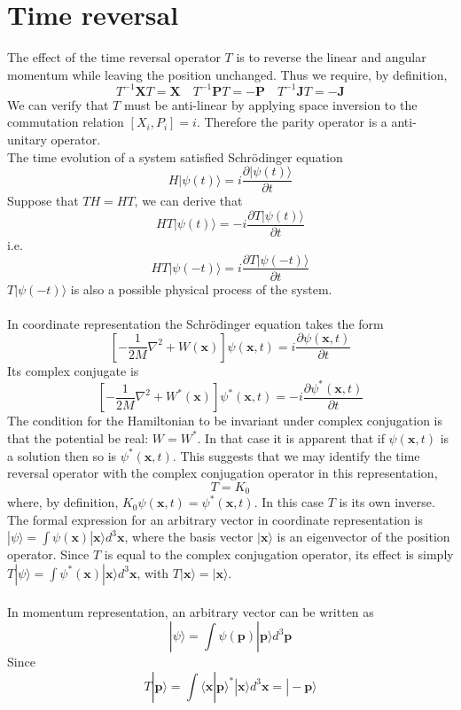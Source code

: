 \documentclass[cyan]{elegantnote}
\begin{document}
\section{Time reversal}
The effect of the time reversal operator $T$ is to reverse the linear and angular momentum while leaving the position unchanged. Thus we require, by definition,
\[T^{-1}\bm{X}T = \bm{X} \quad T^{-1}\bm{P}T = -\bm{P} \quad T^{-1}\bm{J}T = -\bm{J}\]
We can verify that $T$ must be anti-linear by applying space inversion to the commutation relation $[X_i,P_i] = i$. Therefore the parity operator is a anti-unitary operator.\\
The time evolution of a system satisfied Schrödinger equation
\[H|\psi(t)\rangle = i\frac{\partial |\psi(t)\rangle }{\partial t}\]
Suppose that $TH=HT$, we can derive that
\[HT|\psi(t)\rangle = -i\frac{\partial T|\psi(t)\rangle }{\partial t}\]
i.e.
\[HT|\psi(-t)\rangle = i\frac{\partial T|\psi(-t)\rangle }{\partial t}\]
$T|\psi(-t)\rangle$ is also a possible physical process of the system.\\ \\
In coordinate representation the Schrödinger equation takes the form
\[ \left[ -\frac{1}{2M}\nabla^2 + W(\bm{x}) \right] \psi(\bm{x},t) = i\frac{\partial \psi(\bm{x},t)}{\partial t}\]
Its complex conjugate is
\[ \left[ -\frac{1}{2M}\nabla^2 + W^*(\bm{x}) \right] \psi^*(\bm{x},t) = -i\frac{\partial \psi^*(\bm{x},t)}{\partial t}\]
The condition for the Hamiltonian to be invariant under complex conjugation is that the potential be real: $W=W^*$. In that case it is apparent that if $\psi(\bm{x},t)$ is a solution then so is  $\psi^*(\bm{x},t)$. This suggests that we may identify the time reversal operator with the complex conjugation operator in this representation,
\[T = K_0\]
where, by definition, $K_0\psi(\bm{x},t) = \psi^*(\bm{x},t)$. In this case $T$ is its own inverse. 
The formal expression for an arbitrary vector in coordinate representation is $|\psi\rangle = \int \psi(\bm{x})|\bm{x}\rangle d^3 \bm{x}$, where the basis vector $|\bm{x}\rangle$ is an eigenvector of the position operator. Since $T$ is equal to the complex conjugation operator, its effect is simply $T|\psi\rangle = \int \psi^*(\bm{x})|\bm{x}\rangle d^3 \bm{x}$, with $T|\bm{x}\rangle = |\bm{x}\rangle$.\\ \\
In momentum representation, an arbitrary vector can be written as
\[|\psi\rangle = \int \psi(\bm{p})|\bm{p}\rangle d^3 \bm{p}\]
Since
\[T|\bm{p}\rangle = \int \langle \bm{x} | \bm{p}\rangle^* |
\bm{x}\rangle d^3 \bm{x} = |-\bm{p}\rangle\]
\end{document}

